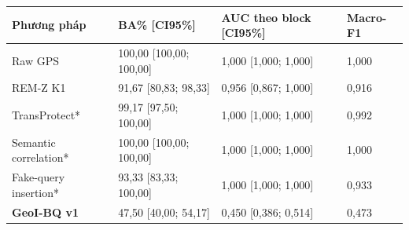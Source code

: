 \par\smallskip\noindent\begin{tabularx}{\linewidth}{@{}P{3cm}XXX@{}}\toprule
\textbf{Phương pháp} & \textbf{BA\% [CI95\%]} & \textbf{AUC theo block [CI95\%]} & \textbf{Macro-F1} \\
\midrule
Raw GPS & 100{,}00 [100{,}00; 100{,}00] & 1{,}000 [1{,}000; 1{,}000] & 1{,}000 \\
REM-Z K1 & 91{,}67 [80{,}83; 98{,}33] & 0{,}956 [0{,}867; 1{,}000] & 0{,}916 \\
TransProtect* & 99{,}17 [97{,}50; 100{,}00] & 1{,}000 [1{,}000; 1{,}000] & 0{,}992 \\
Semantic correlation* & 100{,}00 [100{,}00; 100{,}00] & 1{,}000 [1{,}000; 1{,}000] & 1{,}000 \\
Fake-query insertion* & 93{,}33 [83{,}33; 100{,}00] & 1{,}000 [1{,}000; 1{,}000] & 0{,}933 \\
\textbf{GeoI-BQ v1} & 47{,}50 [40{,}00; 54{,}17] & 0{,}450 [0{,}386; 0{,}514] & 0{,}473 \\
\bottomrule\end{tabularx}\par\smallskip
